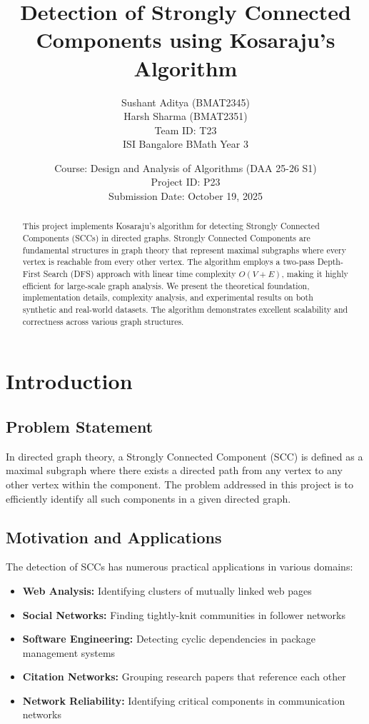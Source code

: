 \documentclass[12pt]{article}
\title{\textbf{Detection of Strongly Connected Components using Kosaraju's Algorithm}}
\author{
    Sushant Aditya (BMAT2345) \\
    Harsh Sharma (BMAT2351) \\
    \small{Team ID: T23} \\
    \small{ISI Bangalore BMath Year 3}
}
\date{
    Course: Design and Analysis of Algorithms (DAA 25-26 S1) \\
    Project ID: P23 \\
    Submission Date: October 19, 2025
}
\begin{document}
\maketitle

\begin{abstract}
This project implements Kosaraju's algorithm for detecting Strongly Connected Components (SCCs) in directed graphs. Strongly Connected Components are fundamental structures in graph theory that represent maximal subgraphs where every vertex is reachable from every other vertex. The algorithm employs a two-pass Depth-First Search (DFS) approach with linear time complexity $O(V + E)$, making it highly efficient for large-scale graph analysis. We present the theoretical foundation, implementation details, complexity analysis, and experimental results on both synthetic and real-world datasets. The algorithm demonstrates excellent scalability and correctness across various graph structures.
\end{abstract}

\section{Introduction}
\subsection{Problem Statement}
In directed graph theory, a Strongly Connected Component (SCC) is defined as a maximal subgraph where there exists a directed path from any vertex to any other vertex within the component. The problem addressed in this project is to efficiently identify all such components in a given directed graph.

\subsection{Motivation and Applications}
The detection of SCCs has numerous practical applications in various domains:

\begin{itemize}
    \item \textbf{Web Analysis:} Identifying clusters of mutually linked web pages
    \item \textbf{Social Networks:} Finding tightly-knit communities in follower networks
    \item \textbf{Software Engineering:} Detecting cyclic dependencies in package management systems
    \item \textbf{Citation Networks:} Grouping research papers that reference each other
    \item \textbf{Network Reliability:} Identifying critical components in communication networks
\end{itemize}
\end{document}
